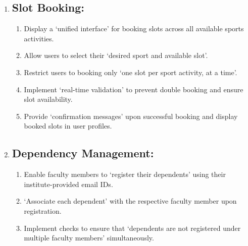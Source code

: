 \documentclass[12pt]{article}
\begin{document}
\begin{enumerate}
    \item[] \subsection{Slot Booking:}
    \begin{enumerate}[label=\alph*)]
        \item Display a `unified interface' for booking slots across all available sports activities.
        \item Allow users to select their `desired sport and available slot'.
        \item Restrict users to booking only `one slot per sport activity, at a time'.
        \item Implement `real-time validation' to prevent double booking and ensure slot availability.
        \item Provide `confirmation messages' upon successful booking and display booked slots in user profiles.
    \end{enumerate}

    \newpage

    \item[] \subsection{Dependency Management:}
    \begin{enumerate}[label=\alph*)]
        \item Enable faculty members to `register their dependents' using their institute-provided email IDs.
        \item `Associate each dependent' with the respective faculty member upon registration.
        \item Implement checks to ensure that `dependents are not registered under multiple faculty members' simultaneously.
    \end{enumerate}

    \vspace{0.4cm}


\end{enumerate}
\end{document}
